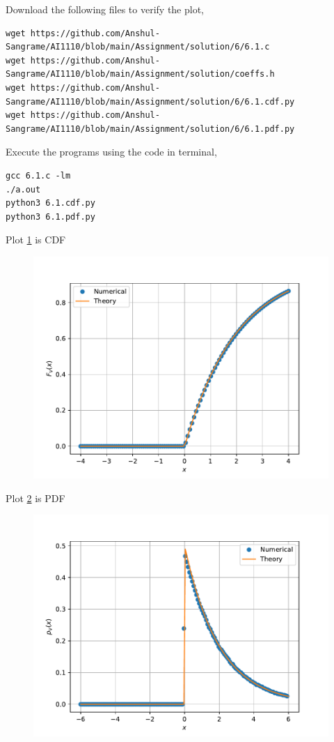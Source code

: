\documentclass[journal,12pt,twocolumn]{IEEEtran}
\renewcommand\thesection{\arabic{section}}
\begin{document}
\begin{enumerate}[label=\thesection.\arabic*,ref=\thesection.\theenumi]
Download the following files to verify the plot,
\begin{lstlisting}
wget https://github.com/Anshul-Sangrame/AI1110/blob/main/Assignment/solution/6/6.1.c
wget https://github.com/Anshul-Sangrame/AI1110/blob/main/Assignment/solution/coeffs.h
wget https://github.com/Anshul-Sangrame/AI1110/blob/main/Assignment/solution/6/6.1.cdf.py
wget https://github.com/Anshul-Sangrame/AI1110/blob/main/Assignment/solution/6/6.1.pdf.py
\end{lstlisting}
Execute the programs using the code in terminal,
\begin{lstlisting}
gcc 6.1.c -lm
./a.out
python3 6.1.cdf.py
python3 6.1.pdf.py
\end{lstlisting}
Plot \ref{fig:6.1.cdf} is CDF
\begin{figure}[!ht]
    \centering
    \includegraphics[width=\columnwidth]{../figs/chi_cdf.pdf}
    \caption{}
    \label{fig:6.1.cdf}
\end{figure}

Plot \ref{fig:6.1.pdf} is PDF
\begin{figure}[!ht]
    \centering
    \includegraphics[width=\columnwidth]{../figs/chi_pdf.pdf}
    \caption{}
    \label{fig:6.1.pdf}
\end{figure}
%
\end{enumerate}
%
\end{document}
